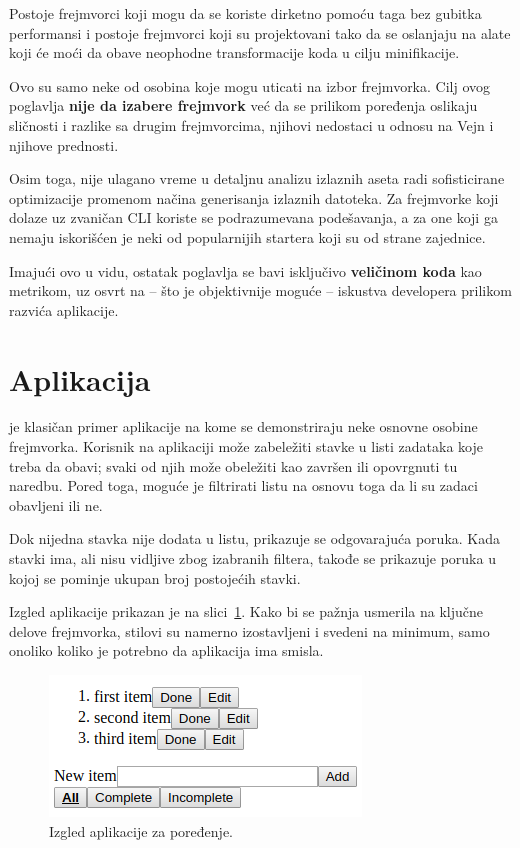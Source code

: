 Postoje frejmvorci koji mogu da se koriste dirketno pomoću  taga bez gubitka performansi i postoje frejmvorci koji su projektovani tako da se oslanjaju na alate koji će moći da obave neophodne transformacije koda u cilju minifikacije.

Ovo su samo neke od osobina koje mogu uticati na izbor frejmvorka.
Cilj ovog poglavlja \textbf{nije da izabere  frejmvork} već da se prilikom poređenja oslikaju sličnosti i razlike sa drugim frejmvorcima, njihovi nedostaci u odnosu na Vejn i njihove prednosti.

Osim toga, nije ulagano vreme u detaljnu analizu izlaznih aseta radi sofisticirane optimizacije promenom načina generisanja izlaznih datoteka.
Za frejmvorke koji dolaze uz zvaničan CLI koriste se podrazumevana podešavanja, a za one koji ga nemaju iskorišćen je neki od popularnijih startera koji su  od strane zajednice.

Imajući ovo u vidu, ostatak poglavlja se bavi isključivo \textbf{veličinom koda} kao metrikom, uz osvrt na -- što je objektivnije moguće -- iskustva developera prilikom razvića aplikacije.

\section{Aplikacija}
\label{subsec:app}

 je klasičan primer aplikacije na kome se demonstriraju neke osnovne osobine frejmvorka.
Korisnik na aplikaciji može zabeležiti stavke u listi zadataka koje treba da obavi; svaki od njih može obeležiti kao završen ili opovrgnuti tu naredbu.
Pored toga, moguće je filtrirati listu na osnovu toga da li su zadaci obavljeni ili ne.

Dok nijedna stavka nije dodata u listu, prikazuje se odgovarajuća poruka.
Kada stavki ima, ali nisu vidljive zbog izabranih filtera, takođe se prikazuje poruka u kojoj se pominje ukupan broj postojećih stavki.

Izgled aplikacije prikazan je na slici~\ref{fig:izgled-app}. Kako bi se pažnja usmerila na ključne delove frejmvorka, stilovi su namerno izostavljeni i svedeni na minimum, samo onoliko koliko je potrebno da aplikacija ima smisla.

\begin{figure}
  \centering
  \includegraphics[scale=0.5]{ch06/app.png}
  \caption{Izgled aplikacije za poređenje.}
  \label{fig:izgled-app}
\end{figure}

